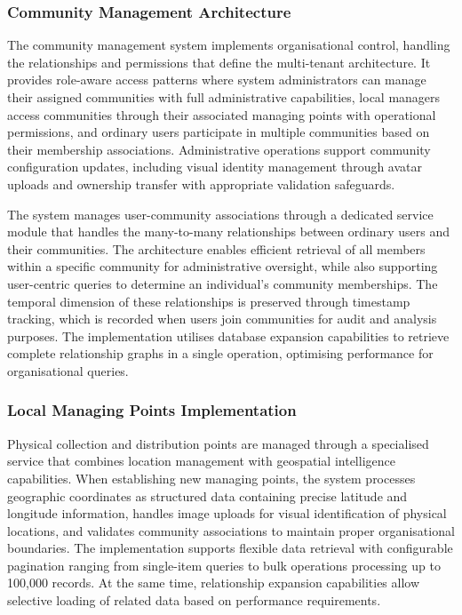 \subsubsection{Community Management Architecture}

The community management system implements organisational control, handling the relationships and permissions that define the multi-tenant architecture. It provides role-aware access patterns where system administrators can manage their assigned communities with full administrative capabilities, local managers access communities through their associated managing points with operational permissions, and ordinary users participate in multiple communities based on their membership associations. Administrative operations support community configuration updates, including visual identity management through avatar uploads and ownership transfer with appropriate validation safeguards.

The system manages user-community associations through a dedicated service module that handles the many-to-many relationships between ordinary users and their communities. The architecture enables efficient retrieval of all members within a specific community for administrative oversight, while also supporting user-centric queries to determine an individual's community memberships. The temporal dimension of these relationships is preserved through timestamp tracking, which is recorded when users join communities for audit and analysis purposes. The implementation utilises database expansion capabilities to retrieve complete relationship graphs in a single operation, optimising performance for organisational queries.

\subsubsection{Local Managing Points Implementation}

Physical collection and distribution points are managed through a specialised service that combines location management with geospatial intelligence capabilities. When establishing new managing points, the system processes geographic coordinates as structured data containing precise latitude and longitude information, handles image uploads for visual identification of physical locations, and validates community associations to maintain proper organisational boundaries. The implementation supports flexible data retrieval with configurable pagination ranging from single-item queries to bulk operations processing up to 100,000 records. At the same time, relationship expansion capabilities allow selective loading of related data based on performance requirements.

